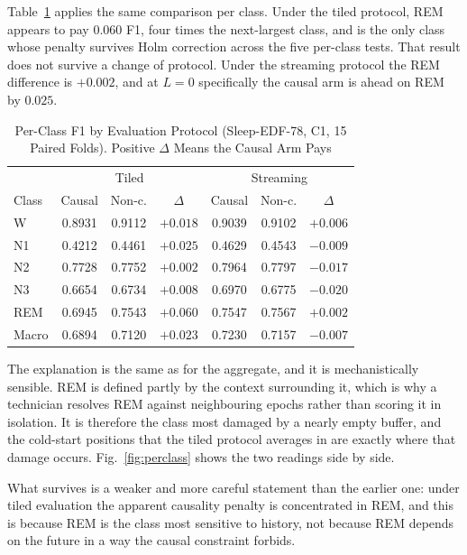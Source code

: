 \documentclass[conference]{IEEEtran}
\begin{document}
Table~\ref{tab:perclass} applies the same comparison per class. Under the tiled protocol, REM appears to
pay $0.060$ F1, four times the next-largest class, and is the only class whose penalty survives Holm
correction across the five per-class tests. That result does not survive a change of protocol. Under the
streaming protocol the REM difference is $+0.002$, and at $L = 0$ specifically the causal arm is ahead on
REM by $0.025$.

\begin{table}[t]
\caption{Per-Class F1 by Evaluation Protocol (Sleep-EDF-78, C1, 15 Paired Folds). Positive $\Delta$ Means
the Causal Arm Pays}
\label{tab:perclass}
\centering
\begin{tabular}{lccc|ccc}
\toprule
 & \multicolumn{3}{c|}{Tiled} & \multicolumn{3}{c}{Streaming} \\
Class & Causal & Non-c. & $\Delta$ & Causal & Non-c. & $\Delta$ \\
\midrule
W   & 0.8931 & 0.9112 & $+0.018$ & 0.9039 & 0.9102 & $+0.006$ \\
N1  & 0.4212 & 0.4461 & $+0.025$ & 0.4629 & 0.4543 & $-0.009$ \\
N2  & 0.7728 & 0.7752 & $+0.002$ & 0.7964 & 0.7797 & $-0.017$ \\
N3  & 0.6654 & 0.6734 & $+0.008$ & 0.6970 & 0.6775 & $-0.020$ \\
REM & 0.6945 & 0.7543 & $\mathbf{+0.060}$ & 0.7547 & 0.7567 & $\mathbf{+0.002}$ \\
\midrule
Macro & 0.6894 & 0.7120 & $+0.023$ & 0.7230 & 0.7157 & $-0.007$ \\
\bottomrule
\end{tabular}
\end{table}

The explanation is the same as for the aggregate, and it is mechanistically sensible. REM is defined
partly by the context surrounding it, which is why a technician resolves REM against neighbouring epochs
rather than scoring it in isolation. It is therefore the class most damaged by a nearly empty buffer, and
the cold-start positions that the tiled protocol averages in are exactly where that damage occurs.
Fig.~\ref{fig:perclass} shows the two readings side by side.

What survives is a weaker and more careful statement than the earlier one: under tiled evaluation the
apparent causality penalty is concentrated in REM, and this is because REM is the class most sensitive to
history, not because REM depends on the future in a way the causal constraint forbids.
\end{document}
